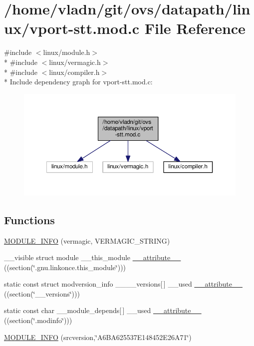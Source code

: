 \hypertarget{vport-stt_8mod_8c}{}\section{/home/vladn/git/ovs/datapath/linux/vport-\/stt.mod.\+c File Reference}
\label{vport-stt_8mod_8c}
{\ttfamily \#include $<$linux/module.\+h$>$}\\*
{\ttfamily \#include $<$linux/vermagic.\+h$>$}\\*
{\ttfamily \#include $<$linux/compiler.\+h$>$}\\*
Include dependency graph for vport-\/stt.mod.\+c\+:
\nopagebreak
\begin{figure}[H]
\begin{center}
\leavevmode
\includegraphics[width=350pt]{vport-stt_8mod_8c__incl}
\end{center}
\end{figure}
\subsection*{Functions}
\begin{DoxyCompactItemize}
\item 
\hyperlink{vport-stt_8mod_8c_a59ae061e50f755cbc9dbde3c6688273a}{M\+O\+D\+U\+L\+E\+\_\+\+I\+N\+F\+O} (vermagic, V\+E\+R\+M\+A\+G\+I\+C\+\_\+\+S\+T\+R\+I\+N\+G)
\item 
\+\_\+\+\_\+visible struct module \+\_\+\+\_\+this\+\_\+module \hyperlink{vport-stt_8mod_8c_acc22bca8fb9ed0433181b5c98efdb5a4}{\+\_\+\+\_\+attribute\+\_\+\+\_\+} ((section(\char`\"{}.gnu.\+linkonce.\+this\+\_\+module\char`\"{})))
\item 
static const struct modversion\+\_\+info \+\_\+\+\_\+\+\_\+\+\_\+versions\mbox{[}$\,$\mbox{]} \+\_\+\+\_\+used \hyperlink{vport-stt_8mod_8c_a3457b560a580904370cd8cbaddb0c902}{\+\_\+\+\_\+attribute\+\_\+\+\_\+} ((section(\char`\"{}\+\_\+\+\_\+versions\char`\"{})))
\item 
static const char \+\_\+\+\_\+module\+\_\+depends\mbox{[}$\,$\mbox{]} \+\_\+\+\_\+used \hyperlink{vport-stt_8mod_8c_aebedc6dfadccd01faf3f462d4fa936f7}{\+\_\+\+\_\+attribute\+\_\+\+\_\+} ((section(\char`\"{}.modinfo\char`\"{})))
\item 
\hyperlink{vport-stt_8mod_8c_aeab078a8e988129b7e8f870cf298cb10}{M\+O\+D\+U\+L\+E\+\_\+\+I\+N\+F\+O} (srcversion,\char`\"{}A6\+B\+A625537\+E148452\+E26\+A71\char`\"{})
\end{DoxyCompactItemize}


